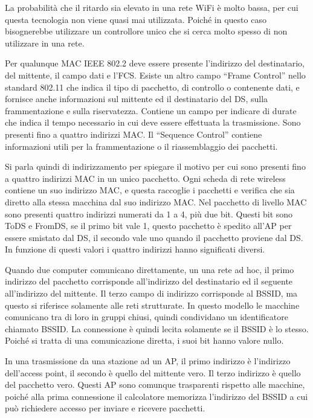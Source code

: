 \documentclass{article}
\numberwithin{equation}{subsection}
\begin{document}
La probabilità che il ritardo sia elevato in una rete WiFi è molto bassa, per cui questa tecnologia non viene quasi mai utilizzata. Poiché in questo caso bisognerebbe 
utilizzare un controllore unico che si cerca molto spesso di non utilizzare in una rete. 

Per qualunque MAC IEEE 802.2 deve essere presente l'indirizzo del destinatario, del mittente, il campo dati e l'FCS. 
Esiste un altro campo ``Frame Control'' nello standard 802.11 che indica il tipo di pacchetto, di controllo o contenente dati, e fornisce anche informazioni 
sul mittente ed il destinatario del DS, sulla frammentazione e sulla riservatezza. Contiene un campo per indicare di durate che indica il tempo necessario in cui deve 
essere effettuata la trasmissione. Sono presenti fino a quattro indirizzi MAC. Il ``Sequence Control'' contiene informazioni utili per la frammentazione o il riassemblaggio 
dei pacchetti. 

Si parla quindi di indirizzamento per spiegare il motivo per cui sono presenti fino a quattro indirizzi MAC in un unico pacchetto. Ogni scheda di rete 
wireless contiene un suo indirizzo MAC, e questa raccoglie i pacchetti e verifica che sia diretto alla stessa macchina dal suo indirizzo MAC. Nel pacchetto di livello MAC 
sono presenti quattro indirizzi numerati da 1 a 4, più due bit. Questi bit sono ToDS e FromDS, se il primo bit vale 1, questo pacchetto è spedito all'AP per essere 
smistato dal DS, il secondo vale uno quando il pacchetto proviene dal DS. In funzione di questi valori i quattro indirizzi hanno significati diversi. 



Quando due computer comunicano direttamente, un una rete ad hoc, il primo indirizzo del pacchetto corrisponde all'indirizzo del destinatario ed il seguente all'indirizzo 
del mittente. Il terzo campo di indirizzo corrisponde al BSSID, ma questo si riferisce solamente alle reti strutturate. In questo modello le macchine comunicano tra di 
loro in gruppi chiusi, quindi condividano un identificatore chiamato BSSID. La connessione è quindi lecita solamente se il BSSID è lo stesso. Poiché si tratta di 
una comunicazione diretta, i suoi bit hanno valore nullo. 

In una trasmissione da una stazione ad un AP, il primo indirizzo è l'indirizzo dell'access point, il secondo è quello del mittente vero. Il terzo indirizzo è quello 
del pacchetto vero. Questi AP sono comunque trasparenti rispetto alle macchine, poiché alla prima connessione il calcolatore memorizza l'indirizzo del BSSID a cui può 
richiedere accesso per inviare e ricevere pacchetti. 
\end{document}
